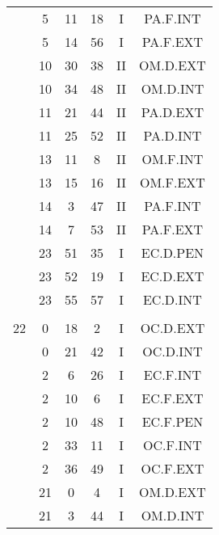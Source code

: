 \documentclass[12pt, a4paper]{article}
\begin{document}
\begin{multicols}{3}
{\begin{tabular}{c c c c c c}
	 	 	 	 & 5 & 11 & 18 & I & PA.F.INT\\%
	 	 	 	 & 5 & 14 & 56 & I & PA.F.EXT\\%
	 	 	 	 & 10 & 30 & 38 & II & OM.D.EXT\\%
	 	 	 	 & 10 & 34 & 48 & II & OM.D.INT\\%
	 	 	 	 & 11 & 21 & 44 & II & PA.D.EXT\\%
	 	 	 	 & 11 & 25 & 52 & II & PA.D.INT\\%
	 	 	 	 & 13 & 11 & 8 & II & OM.F.INT\\%
	 	 	 	 & 13 & 15 & 16 & II & OM.F.EXT\\%
	 	 	 	 & 14 & 3 & 47 & II & PA.F.INT\\%
	 	 	 	 & 14 & 7 & 53 & II & PA.F.EXT\\%
	 	 	 	 & 23 & 51 & 35 & I & EC.D.PEN\\%
	 	 	 	 & 23 & 52 & 19 & I & EC.D.EXT\\%
	 	 	 	 & 23 & 55 & 57 & I & EC.D.INT\\%
	 	 	 	 & & & & & \\%
	 	 	 	22 & 0 & 18 & 2 & I & OC.D.EXT\\%
	 	 	 	 & 0 & 21 & 42 & I & OC.D.INT\\%
	 	 	 	 & 2 & 6 & 26 & I & EC.F.INT\\%
	 	 	 	 & 2 & 10 & 6 & I & EC.F.EXT\\%
	 	 	 	 & 2 & 10 & 48 & I & EC.F.PEN\\%
	 	 	 	 & 2 & 33 & 11 & I & OC.F.INT\\%
	 	 	 	 & 2 & 36 & 49 & I & OC.F.EXT\\%
	 	 	 	 & 21 & 0 & 4 & I & OM.D.EXT\\%
	 	 	 	 & 21 & 3 & 44 & I & OM.D.INT\\%

\end{tabular}}
\end{multicols}
\end{document}
